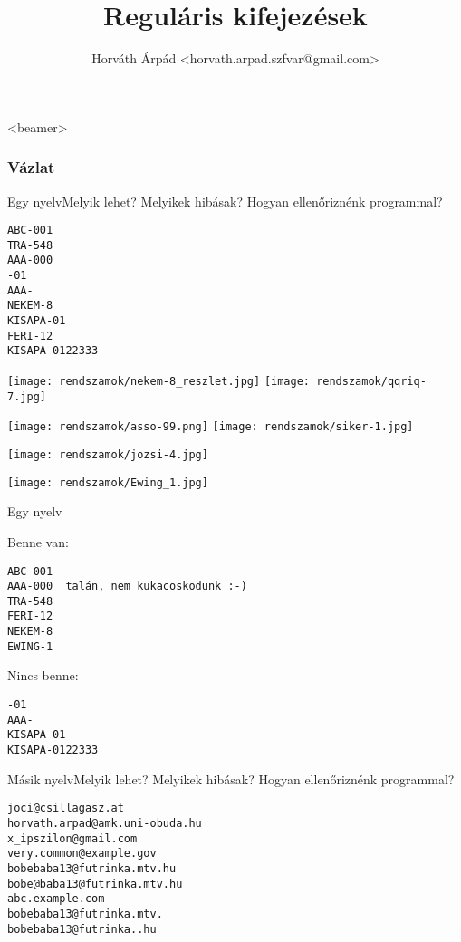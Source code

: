\documentclass[
    ignorenonframetext
    ]{beamer}
\title{Regul\'aris kifejez\'esek}
\subtitle{}
\author{Horváth Árpád <horvath.arpad.szfvar@gmail.com>}
\institute[]{}
\begin{document}
\frame{\maketitle}

\begin{frame}<beamer>
  \frametitle{Vázlat}
  \tableofcontents
\end{frame}

\begin{frame}[fragile]
    {Egy nyelv}{Melyik lehet? Melyikek hibásak? Hogyan ellenőriznénk programmal?}

\begin{verbatim}
ABC-001
TRA-548
AAA-000
-01
AAA-
NEKEM-8
KISAPA-01
FERI-12
KISAPA-0122333
\end{verbatim}
\end{frame}

\begin{frame}
    \noindent
    \texttt{[image: rendszamok/nekem-8\_reszlet.jpg]} 
    \texttt{[image: rendszamok/qqriq-7.jpg]} 

    \noindent
    \texttt{[image: rendszamok/asso-99.png]} 
    \texttt{[image: rendszamok/siker-1.jpg]} 
\end{frame}

\begin{frame}
    \noindent
    \texttt{[image: rendszamok/jozsi-4.jpg]} 
\end{frame}

\begin{frame}
    \noindent
    \texttt{[image: rendszamok/Ewing\_1.jpg]}
\end{frame}

\begin{frame}[fragile]
    {Egy nyelv}

Benne van:
\begin{verbatim}
ABC-001
AAA-000  talán, nem kukacoskodunk :-)
TRA-548
FERI-12
NEKEM-8
EWING-1
\end{verbatim}

Nincs benne:
\begin{verbatim}
-01
AAA-
KISAPA-01
KISAPA-0122333
\end{verbatim}
\end{frame}

\begin{frame}[fragile]
    {Másik nyelv}{Melyik lehet? Melyikek hibásak? Hogyan ellenőriznénk programmal?}

\begin{verbatim}
joci@csillagasz.at
horvath.arpad@amk.uni-obuda.hu
x_ipszilon@gmail.com
very.common@example.gov
bobebaba13@futrinka.mtv.hu
bobe@baba13@futrinka.mtv.hu
abc.example.com
bobebaba13@futrinka.mtv.
bobebaba13@futrinka..hu
\end{verbatim}
\end{frame}
\end{document}
